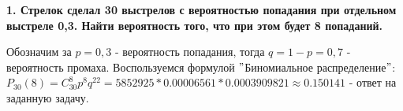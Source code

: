 \documentclass{article}
\begin{document}
\noindent \textbf{1. Стрелок сделал 30 выстрелов с вероятностью попадания при отдельном выстреле 0,3. Найти вероятность того, что при этом будет 8 попаданий.}

Обозначим за $p=0,3$ - вероятность попадания, тогда $q=1-p=0,7$ - вероятность промаха. Воспользуемся формулой $"$Биномиальное распределение$"$: $P_{30}(8) = C_{30}^8p^8q^{22}= 5852925 * 0.00006561 * 0.0003909821 \approx 0.150141$ - ответ на заданную задачу.
\end{document}
